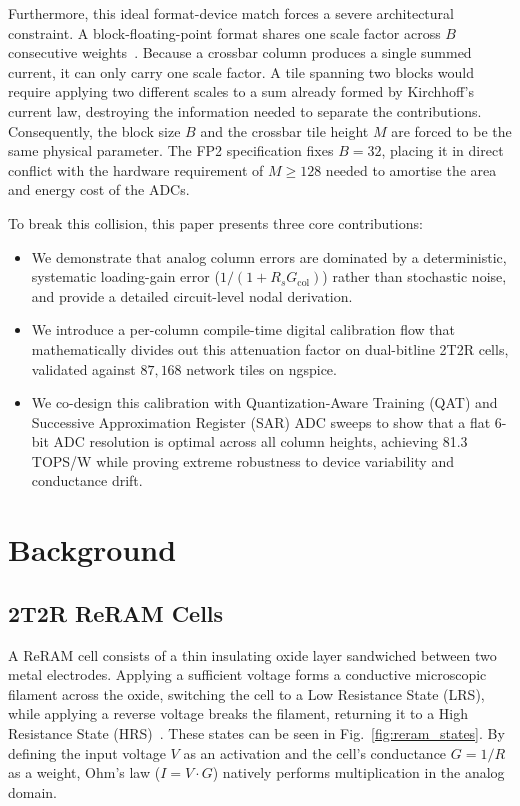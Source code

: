 \documentclass[conference]{IEEEtran}
\begin{document}
Furthermore, this ideal format-device match forces a severe architectural constraint. A block-floating-point format shares one scale factor across $B$ consecutive weights~\cite{fp2}. Because a crossbar column produces a single summed current, it can only carry one scale factor. A tile spanning two blocks would require applying two different scales to a sum already formed by Kirchhoff's current law, destroying the information needed to separate the contributions. Consequently, the block size $B$ and the crossbar tile height $M$ are forced to be the same physical parameter. The FP2 specification fixes $B=32$, placing it in direct conflict with the hardware requirement of $M \ge 128$ needed to amortise the area and energy cost of the ADCs.

To break this collision, this paper presents three core contributions:
\begin{itemize}
    \item We demonstrate that analog column errors are dominated by a deterministic, systematic loading-gain error ($1/(1+R_s G_{\text{col}})$) rather than stochastic noise, and provide a detailed circuit-level nodal derivation.
    \item We introduce a per-column compile-time digital calibration flow that mathematically divides out this attenuation factor on dual-bitline 2T2R cells, validated against $87{,}168$ network tiles on ngspice.
    \item We co-design this calibration with Quantization-Aware Training (QAT) and Successive Approximation Register (SAR) ADC sweeps to show that a flat 6-bit ADC resolution is optimal across all column heights, achieving 81.3 TOPS/W while proving extreme robustness to device variability and conductance drift.
\end{itemize}

\section{Background}
\subsection{2T2R ReRAM Cells}
A ReRAM cell consists of a thin insulating oxide layer sandwiched between two metal electrodes. Applying a sufficient voltage forms a conductive microscopic filament across the oxide, switching the cell to a Low Resistance State (LRS), while applying a reverse voltage breaks the filament, returning it to a High Resistance State (HRS)~\cite{zahoor2020}. These states can be seen in Fig.~\ref{fig:reram_states}. By defining the input voltage $V$ as an activation and the cell's conductance $G = 1/R$ as a weight, Ohm's law ($I = V \cdot G$) natively performs multiplication in the analog domain.
\end{document}
